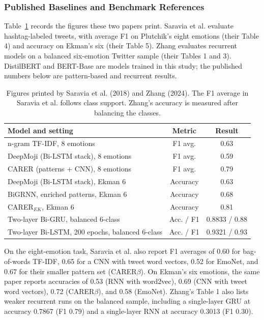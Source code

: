 \documentclass[conference]{IEEEtran}
\begin{document}
\subsubsection{Published Baselines and Benchmark References}
Table~\ref{tab:published_baselines} records the figures these two papers print. Saravia et al. \cite{saravia2018carer} evaluate hashtag-labeled tweets, with average F1 on Plutchik's eight emotions (their Table 4) and accuracy on Ekman's six (their Table 5). Zhang \cite{zhang2024comparative} evaluates recurrent models on a balanced six-emotion Twitter sample (their Tables 1 and 3). DistilBERT and BERT-Base are models trained in this study; the published numbers below are pattern-based and recurrent results.

\begin{table}[htbp]
\centering
\caption{Figures printed by Saravia et al. (2018) and Zhang (2024). The F1 average in Saravia et al. follows class support. Zhang's accuracy is measured after balancing the classes.}
\label{tab:published_baselines}
\fontsize{7pt}{8.5pt}\selectfont
\begin{tabularx}{\columnwidth}{@{} >{\raggedright\arraybackslash}X c c @{}}
\toprule
\textbf{Model and setting} & \textbf{Metric} & \textbf{Result} \\
\midrule
n-gram TF-IDF, 8 emotions \cite{saravia2018carer} & F1 avg. & 0.63 \\
DeepMoji (Bi-LSTM stack), 8 emotions \cite{saravia2018carer} & F1 avg. & 0.59 \\
CARER (patterns + CNN), 8 emotions \cite{saravia2018carer} & F1 avg. & 0.79 \\
DeepMoji (Bi-LSTM stack), Ekman 6 \cite{saravia2018carer} & Accuracy & 0.63 \\
BiGRNN, enriched patterns, Ekman 6 \cite{saravia2018carer} & Accuracy & 0.68 \\
CARER$_{EK}$, Ekman 6 \cite{saravia2018carer} & Accuracy & 0.81 \\
Two-layer Bi-GRU, balanced 6-class \cite{zhang2024comparative} & Acc. / F1 & 0.8833 / 0.88 \\
Two-layer Bi-LSTM, 200 epochs, balanced 6-class \cite{zhang2024comparative} & Acc. / F1 & 0.9321 / 0.93 \\
\bottomrule
\end{tabularx}
\end{table}

On the eight-emotion task, Saravia et al. also report F1 averages of 0.60 for bag-of-words TF-IDF, 0.65 for a CNN with tweet word vectors, 0.52 for EmoNet, and 0.67 for their smaller pattern set (CARER$\beta$). On Ekman's six emotions, the same paper reports accuracies of 0.53 (RNN with word2vec), 0.69 (CNN with tweet word vectors), 0.72 (CARER$\beta$), and 0.58 (EmoNet). Zhang's Table 1 also lists weaker recurrent runs on the balanced sample, including a single-layer GRU at accuracy 0.7867 (F1 0.79) and a single-layer RNN at accuracy 0.3013 (F1 0.30).
\end{document}
